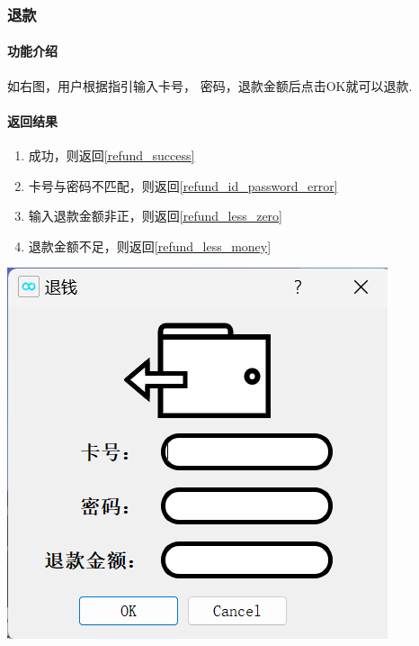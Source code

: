 \documentclass{article}
\begin{document}
    \subsubsection{退款}
    \begin{minipage}[h]{0.5\linewidth}
        \paragraph{功能介绍}
        如右图，用户根据指引输入卡号，
        密码，退款金额后点击OK就可以退款.
        \vfill
        \paragraph{返回结果}
        \begin{enumerate}
            \item 成功，则返回\ref{refund_success}
            \item 卡号与密码不匹配，则返回\ref{refund_id_password_error}
            \item 输入退款金额非正，则返回\ref{refund_less_zero}
            \item 退款金额不足，则返回\ref{refund_less_money}
        \end{enumerate}
    \end{minipage}
    \begin{minipage}[h]{0.5\linewidth}
        \centering
        \includegraphics[scale=0.6]{figure/refund.png}
        \label{refund}
    \end{minipage}
\end{document}

